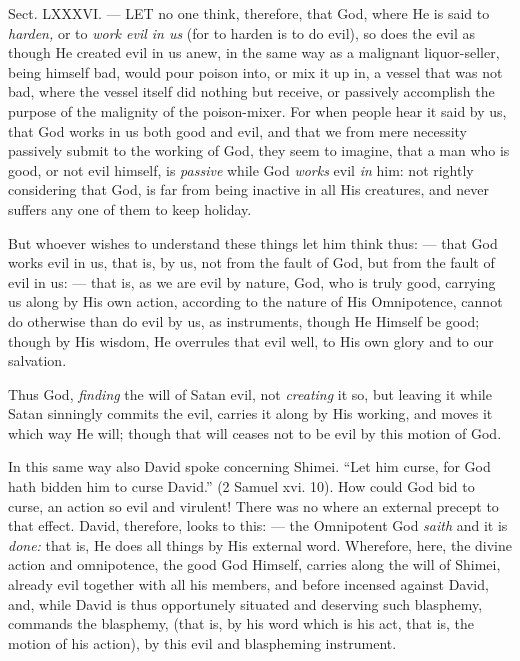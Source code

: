 
Sect. LXXXVI. — LET no one think, therefore, that God, where He is said to \emph{harden, }or to \emph{work evil in us }(for to harden is to do evil), so does the evil as though He created evil in us anew, in the same way as a malignant liquor-seller, being himself bad, would pour poison into, or mix it up in, a vessel that was not bad, where the vessel itself did nothing but receive, or passively accomplish the purpose of the malignity of the poison-mixer. For when people hear it said by us, that God works in us both good and evil, and that we from mere necessity passively submit to the working of God, they seem to imagine, that a man who is good, or not evil himself, is \emph{passive }while God \emph{works }evil \emph{in }him: not rightly considering that God, is far from being inactive in all His creatures, and never suffers any one of them to keep holiday.

But whoever wishes to understand these things let him think thus: — that God works evil in us, that is, by us, not from the fault of God, but from the fault of evil in us: — that is, as we are evil by nature, God, who is truly good, carrying us along by His own action, according to the nature of His Omnipotence, cannot do otherwise than do evil by us, as instruments, though He Himself be good; though by His wisdom, He overrules that evil well, to His own glory and to our salvation.

Thus God, \emph{finding }the will of Satan evil, not \emph{creating }it so, but leaving it while Satan sinningly commits the evil, carries it along by His working, and moves it which way He will; though that will ceases not to be evil by this motion of God.

In this same way also David spoke concerning Shimei. “Let him curse, for God hath bidden him to curse David.” (2 Samuel xvi. 10). How could God bid to curse, an action so evil and virulent! There was no where an external precept to that effect. David, therefore, looks to this: — the Omnipotent God \emph{saith }and it is \emph{done: }that is, He does all things by His external word. Wherefore, here, the divine action and omnipotence, the good God Himself, carries along the will of Shimei, already evil together with all his members, and before incensed against David, and, while David is thus opportunely situated and deserving such blasphemy, commands the blasphemy, (that is, by his word which is his act, that is, the motion of his action), by this evil and blaspheming instrument.

